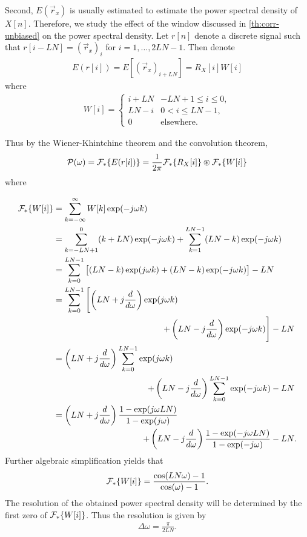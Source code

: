 \documentclass[a4paper, openany, oneside]{memoir}
\begin{document}
Second, $E(\vec{r}_x)$ is usually estimated to estimate the power spectral density of $X[n]$. Therefore, we study the effect of the window discussed in \cref{th:corr-unbiased} on the power spectral density. Let $r[n]$ denote a discrete signal such that $r[i - LN] = (\vec{r}_x)_i$ for $i = 1,\ldots,2LN-1$. Then denote
\begin{align*}
    E(r[i])=E[(\vec{r}_x)_{i + LN}]=R_X[i] W[i]
\end{align*}
where
\begin{align*}
    W[i] = \begin{cases}
        i+LN  & -LN+1 \le i \le 0, \\
        LN-i& 0 < i \le LN-1, \\
        0 & \text{elsewhere.}
    \end{cases}
\end{align*}

Thus by the Wiener-Khintchine theorem and the convolution theorem,
\begin{align*}
    \mathcal{P}(\omega)=\mathcal{F}_*\{E(r[i])\} = \frac{1}{2 \pi}\mathcal{F}_*\{R_X[i]\} \circledast \mathcal{F}_*\{W[i]\}
\end{align*}
where

\renewcommand{\pushrightwidth}{10cm}
\begin{align*}
    \DTFT\{W[i]\} &= \sum_{k=-\infty}^{\infty}W[k]\exp(-j \omega k) \\
    &= \sum_{k=-LN+1}^{0}(k +LN)\exp(-j \omega k) + \sum_{k=1}^{LN-1}(LN-k) \exp(-j \omega k) \\
    &= \sum_{k=0}^{LN-1} \left[(LN-k) \exp(j \omega k) + (LN-k) \exp(-j \omega k) \right] - LN \\
    &= \sum_{k=0}^{LN-1} \left[\left(LN+j\frac{d}{d \omega}\right) \exp(j \omega k) \right.
    \\& \pushright{\left. + \left(LN-j \frac{d}{d \omega}\right) \exp(-j \omega k) \right] - LN} \\
    &= \left(LN+j\frac{d}{d \omega}\right) \sum_{k=0}^{LN-1}\exp(j \omega k)
    \\& \pushright{+ \left(LN-j \frac{d}{d \omega}\right) \sum_{k=0}^{LN-1} \exp(-j \omega k) - LN} \\
    &= \left(LN+j\frac{d}{d \omega}\right) \frac{1-\exp(j \omega LN)}{1-\exp(j \omega)}
    \\& \pushright{+ \left(LN-j \frac{d}{d \omega}\right) \frac{1-\exp(-j \omega LN)}{1-\exp(-j \omega)} - LN}.
\end{align*}
Further algebraic simplification yields that
\begin{align*}
    \mathcal{F}_*\{W[i]\} = \frac{\cos(LN \omega) - 1}{\cos(\omega) - 1}.
\end{align*}
The resolution of the obtained power spectral density will be determined by the first zero of $\mathcal{F}_*\{W[i]\}$. Thus the resolution is given by
\begin{align*}
    \Delta \omega = \frac{\pi}{2LN}.
\end{align*}
\end{document}
